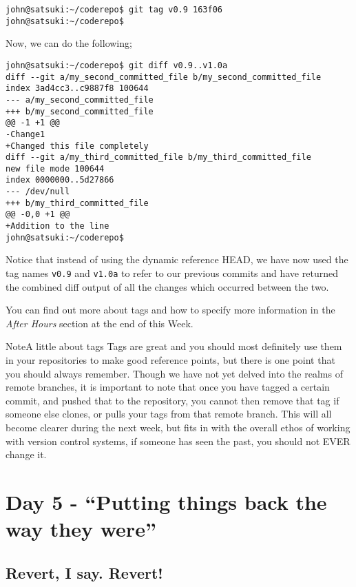 \begin{Verbatim}
john@satsuki:~/coderepo$ git tag v0.9 163f06
john@satsuki:~/coderepo$ 
\end{Verbatim}

Now, we can do the following;

\begin{Verbatim}
john@satsuki:~/coderepo$ git diff v0.9..v1.0a
diff --git a/my_second_committed_file b/my_second_committed_file
index 3ad4cc3..c9887f8 100644
--- a/my_second_committed_file
+++ b/my_second_committed_file
@@ -1 +1 @@
-Change1
+Changed this file completely
diff --git a/my_third_committed_file b/my_third_committed_file
new file mode 100644
index 0000000..5d27866
--- /dev/null
+++ b/my_third_committed_file
@@ -0,0 +1 @@
+Addition to the line
john@satsuki:~/coderepo$ 
\end{Verbatim}

Notice that instead of using the dynamic reference HEAD, we have now used the tag names \texttt{v0.9} and \texttt{v1.0a} to refer to our previous commits and have returned the combined diff output of all the changes which occurred between the two.

You can find out more about tags and how to specify more information in the \emph{After Hours} section at the end of this Week.

\begin{callout}{Note}{A little about tags}
Tags are great and you should most definitely use them in your repositories to make good reference points, but there is one point that you should always remember.  Though we have not yet delved into the realms of remote branches, it is important to note that once you have tagged a certain commit, and pushed that to the repository, you cannot then remove that tag if someone else clones, or pulls your tags from that remote branch.  This will all become clearer during the next week, but fits in with the overall ethos of working with version control systems, if someone has seen the past, you should not EVER change it.
\end{callout}

\section{Day 5 - ``Putting things back the way they were''}
\subsection{Revert, I say.  Revert!}

